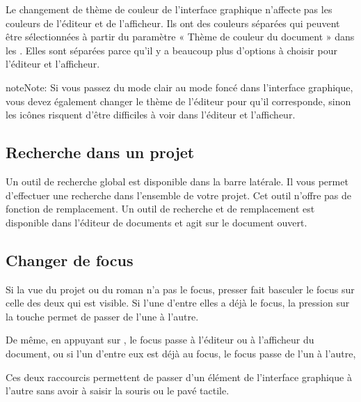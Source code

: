 \documentclass[a4paper,11pt,french]{sphinxmanual}
\begin{document}
\sphinxAtStartPar
Le changement de thème de couleur de l’interface graphique n’affecte pas les couleurs de l’éditeur et de l’afficheur. Ils ont des couleurs séparées qui peuvent être sélectionnées à partir du paramètre « Thème de couleur du document » dans les . Elles sont séparées parce qu’il y a beaucoup plus d’options à choisir pour l’éditeur et l’afficheur.

\begin{sphinxadmonition}{note}{Note:}
\sphinxAtStartPar
Si vous passez du mode clair au mode foncé dans l’interface graphique, vous devez également changer le thème de l’éditeur pour qu’il corresponde, sinon les icônes risquent d’être difficiles à voir dans l’éditeur et l’afficheur.
\end{sphinxadmonition}


\subsection{Recherche dans un projet}
\label{\detokenize{usage_breakdown:project-search}}
\sphinxAtStartPar
Un outil de recherche global est disponible dans la barre latérale. Il vous permet d’effectuer une recherche dans l’ensemble de votre projet. Cet outil n’offre pas de fonction de remplacement. Un outil de recherche et de remplacement est disponible dans l’éditeur de documents et agit sur le document ouvert.

\sphinxAtStartPar
{}


\subsection{Changer de focus}
\label{\detokenize{usage_breakdown:switching-focus}}
\sphinxAtStartPar
Si la vue du projet ou du roman n’a pas le focus, presser  fait basculer le focus sur celle des deux qui est visible. Si l’une d’entre elles a déjà le focus, la pression sur la touche permet de passer de l’une à l’autre.

\sphinxAtStartPar
De même, en appuyant sur , le focus passe à l’éditeur ou à l’afficheur du document, ou si l’un d’entre eux est déjà au focus, le focus passe de l’un à l’autre,

\sphinxAtStartPar
Ces deux raccourcis permettent de passer d’un élément de l’interface graphique à l’autre sans avoir à saisir la souris ou le pavé tactile.
\end{document}
